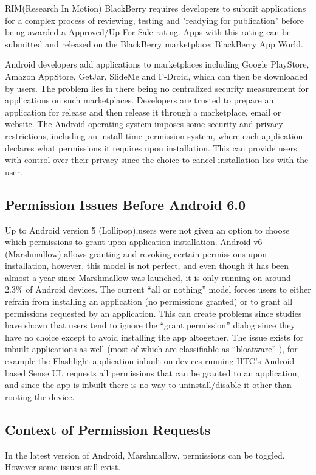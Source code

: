RIM(Research In Motion) BlackBerry requires developers to submit applications for a complex process of reviewing, testing and "readying for publication" before being awarded a Approved/Up For Sale rating. Apps with this rating can be submitted and released on the BlackBerry marketplace; BlackBerry App World.\cite{j} 
\smallskip

Android developers add applications to marketplaces including Google PlayStore, Amazon AppStore, GetJar, SlideMe and F-Droid, which can then be downloaded by users. The problem lies in there being no centralized security measurement for applications on such marketplaces. Developers are trusted to prepare an application for release and then release it through a marketplace, email or website.\cite{g} The Android operating system imposes some security and privacy restrictions, including an install-time permission system, where each application declares what permissions it requires upon installation.\cite{h} This can provide users with control over their privacy since the choice to cancel installation lies with the user.

\subsection{Permission Issues Before Android 6.0}
Up to Android version 5 (Lollipop),users were not given an option to choose which permissions to grant upon application installation. Android v6 (Marshmallow) allows granting and revoking certain permissions upon installation, however, this model is not perfect, and even though it has been almost a year since Marshmallow was launched, it is only running on around 2.3\% of Android devices. \cite{k} The current “all or nothing” model forces users to either refrain from installing an application (no permissions granted) or to grant all permissions requested by an application. This can create problems since studies have shown that users tend to ignore the “grant permission” dialog since they have no choice except to avoid installing the app altogether. \cite{wijesekera2015android} The issue exists for inbuilt applications as well (most of which are classifiable as “bloatware” \cite{mcdaniel2012bloatware} ), for example the Flashlight application inbuilt on devices running HTC’s Android based Sense UI, requests all permissions that can be granted to an application, and since the app is inbuilt there is no way to uninstall/disable it other than rooting the device. 

\subsection{Context of Permission Requests}
In the latest version of Android, Marshmallow, permissions can be toggled. However some issues still exist. 
\smallskip

